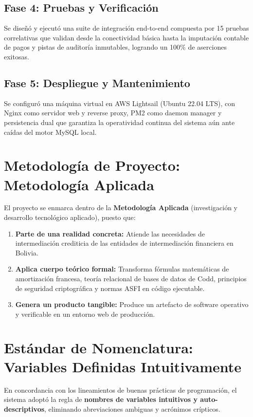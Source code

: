 \documentclass[11pt,letterpaper]{report}
\begin{document}
\subsection{Fase 4: Pruebas y Verificación}
Se diseñó y ejecutó una suite de integración end-to-end compuesta por 15 pruebas correlativas que validan desde la conectividad básica hasta la imputación contable de pagos y pistas de auditoría inmutables, logrando un 100\% de aserciones exitosas.

\subsection{Fase 5: Despliegue y Mantenimiento}
Se configuró una máquina virtual en AWS Lightsail (Ubuntu 22.04 LTS), con Nginx como servidor web y reverse proxy, PM2 como daemon manager y persistencia dual que garantiza la operatividad continua del sistema aún ante caídas del motor MySQL local.

\section{Metodología de Proyecto: Metodología Aplicada}
El proyecto se enmarca dentro de la \textbf{Metodología Aplicada} (investigación y desarrollo tecnológico aplicado), puesto que:
\begin{enumerate}
    \item \textbf{Parte de una realidad concreta:} Atiende las necesidades de intermediación crediticia de las entidades de intermediación financiera en Bolivia.
    \item \textbf{Aplica cuerpo teórico formal:} Transforma fórmulas matemáticas de amortización francesa, teoría relacional de bases de datos de Codd, principios de seguridad criptográfica y normas ASFI en código ejecutable.
    \item \textbf{Genera un producto tangible:} Produce un artefacto de software operativo y verificable en un entorno web de producción.
\end{enumerate}

\section{Estándar de Nomenclatura: Variables Definidas Intuitivamente}
En concordancia con los lineamientos de buenas prácticas de programación, el sistema adoptó la regla de \textbf{nombres de variables intuitivos y auto-descriptivos}, eliminando abreviaciones ambiguas y acrónimos crípticos.
\end{document}
